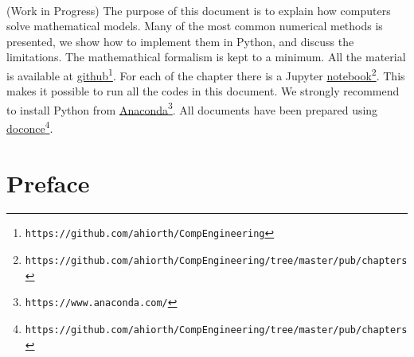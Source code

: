 \documentclass[graybox,sectrefs,envcountresetchap,open=right,final]{svmonodo}
\begin{document}
\ \\ [13mm]
\begin{center}
\begin{minipage}{0.9\linewidth}
\small
(Work in Progress) The purpose of this document is to explain how computers solve mathematical models.
Many of the most common numerical methods is presented, we show how to implement them in Python, and discuss the limitations.
The mathemathical formalism is kept to a minimum. All the material is available at
\href{{https://github.com/ahiorth/CompEngineering}}{github}\footnote{\texttt{https://github.com/ahiorth/CompEngineering}}. For each of the chapter there is a Jupyter \href{{https://github.com/ahiorth/CompEngineering/tree/master/pub/chapters}}{notebook}\footnote{\texttt{https://github.com/ahiorth/CompEngineering/tree/master/pub/chapters}}. This makes it possible to run all the codes in this document.
We strongly recommend to install Python from \href{{https://www.anaconda.com/}}{Anaconda}\footnote{\texttt{https://www.anaconda.com/}}. All documents have been prepared using \href{{https://github.com/ahiorth/CompEngineering/tree/master/pub/chapters}}{doconce}\footnote{\texttt{https://github.com/ahiorth/CompEngineering/tree/master/pub/chapters}}. 





\end{minipage}
\end{center}

\chapter*{Preface}
\label{ch:preface}
\end{document}
